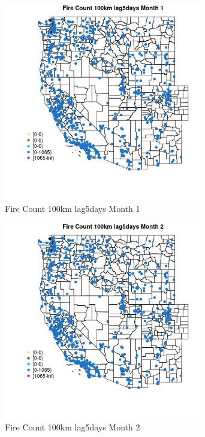 \begin{figure} 
\centering  
\includegraphics[width=0.77\textwidth]{Code_Outputs/Report_ML_input_PM25_Step4_part_f_de_duplicated_aves_prioritize_24hr_obswNAs_MapObsMo1Fire_Count_100km_lag5days.jpg} 
\caption{\label{fig:Report_ML_input_PM25_Step4_part_f_de_duplicated_aves_prioritize_24hr_obswNAsMapObsMo1Fire_Count_100km_lag5days}Fire Count 100km lag5days Month 1} 
\end{figure} 
 

\begin{figure} 
\centering  
\includegraphics[width=0.77\textwidth]{Code_Outputs/Report_ML_input_PM25_Step4_part_f_de_duplicated_aves_prioritize_24hr_obswNAs_MapObsMo2Fire_Count_100km_lag5days.jpg} 
\caption{\label{fig:Report_ML_input_PM25_Step4_part_f_de_duplicated_aves_prioritize_24hr_obswNAsMapObsMo2Fire_Count_100km_lag5days}Fire Count 100km lag5days Month 2} 
\end{figure} 
 

